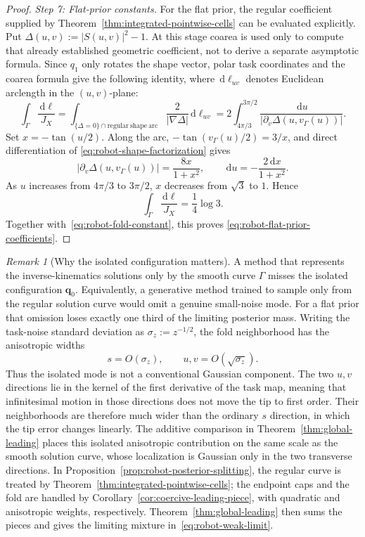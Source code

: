 \documentclass[11pt]{amsart}
\numberwithin{equation}{section}
\theoremstyle{definition}
\theoremstyle{remark}
\newtheorem{remark}[theorem]{Remark}
\newcommand{\dd}{\,\mathrm{d}}
\begin{document}
\begin{proof}
\smallskip
\noindent\emph{Step 7: Flat-prior constants.}
For the flat prior, the regular coefficient supplied by
Theorem~\ref{thm:integrated-pointwise-cells} can be evaluated explicitly.
Put $\Delta(u,v):=|S(u,v)|^2-1$.  At this stage coarea is used
only to compute that already established geometric coefficient, not to derive
a separate asymptotic formula.  Since $q_1$ only rotates the shape vector,
polar task coordinates and the coarea formula give the following identity,
where $\dd\ell_{uv}$ denotes Euclidean arclength in the $(u,v)$-plane:
\begin{equation}\label{eq:robot-flat-regular-reduction}
 \int_\Gamma\frac{\dd\ell}{J_X}
 =\int_{\{\Delta=0\}\cap\mathrm{regular\ shape\ arc}}
 \frac{2}{|\nabla\Delta|}\dd\ell_{uv}
 =2\int_{4\pi/3}^{3\pi/2}
 \frac{\dd u}{|\partial_v\Delta(u,v_\Gamma(u))|}.
\end{equation}
Set $x=-\tan(u/2)$.  Along the arc,
$-\tan(v_\Gamma(u)/2)=3/x$, and direct differentiation of
\eqref{eq:robot-shape-factorization} gives
\[
 |\partial_v\Delta(u,v_\Gamma(u))|=\frac{8x}{1+x^2},
 \qquad
 \dd u=-\frac{2\dd x}{1+x^2}.
\]
As $u$ increases from $4\pi/3$ to $3\pi/2$, $x$ decreases from $\sqrt3$ to
$1$.  Hence
\[
 \int_\Gamma\frac{\dd\ell}{J_X}
 =\frac14\log3.
\]
Together with~\eqref{eq:robot-fold-constant}, this proves
\eqref{eq:robot-flat-prior-coefficients}.
\end{proof}

\begin{remark}[Why the isolated configuration matters]
A method that represents the inverse-kinematics solutions only by the smooth
curve $\Gamma$ misses the isolated configuration $\bm q_0$.  Equivalently, a
generative method trained to sample only from the regular solution curve
would omit a genuine small-noise mode.  For a flat prior that omission loses
exactly one third of the limiting posterior mass.  Writing the task-noise
standard deviation as
$\sigma_z:=z^{-1/2}$, the fold neighborhood has the anisotropic widths
\[
 s=O(\sigma_z),
 \qquad
 u,v=O(\sqrt{\sigma_z}).
\]
Thus the isolated mode is not a conventional Gaussian component.  The two
$u,v$ directions lie in the kernel of the first derivative of the task map,
meaning that infinitesimal motion in those directions does not move the tip to
first order.  Their neighborhoods are therefore much wider than the ordinary
$s$ direction, in which the tip error changes linearly.
The additive comparison in Theorem~\ref{thm:global-leading} places this
isolated anisotropic contribution on the same scale as the smooth solution
curve, whose localization is Gaussian only in the two transverse
directions.  In Proposition~\ref{prop:robot-posterior-splitting}, the regular curve is
treated by Theorem~\ref{thm:integrated-pointwise-cells}; the endpoint caps and
the fold are handled by Corollary~\ref{cor:coercive-leading-piece}, with
quadratic and anisotropic weights, respectively.  Theorem~\ref{thm:global-leading} then sums the pieces and gives the
limiting mixture in~\eqref{eq:robot-weak-limit}.
\end{remark}
\end{document}
